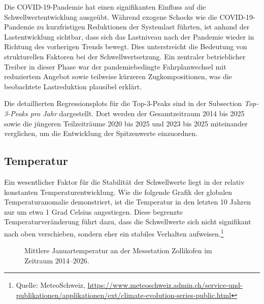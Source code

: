 \documentclass[12pt,oneside]{article}
\begin{document}
Die COVID-19-Pandemie hat einen signifikanten Einfluss auf die Schwellwertentwicklung ausgeübt. Während exogene Schocks wie die COVID-19-Pandemie zu kurzfristigen Reduktionen der Systemlast führten, ist anhand der Lastentwicklung sichtbar, dass sich das Lastniveau nach der Pandemie wieder in Richtung des vorherigen Trends bewegt. Dies unterstreicht die Bedeutung von strukturellen Faktoren bei der Schwellwertsetzung.
Ein zentraler betrieblicher Treiber in dieser Phase war der pandemiebedingte Fahrplanwechsel mit reduziertem Angebot sowie teilweise kürzeren Zugkompositionen, was die beobachtete Lastreduktion plausibel erklärt.

Die detaillierten Regressionsplots für die Top-3-Peaks sind in der Subsection \emph{Top-3-Peaks pro Jahr} dargestellt. Dort werden der Gesamtzeitraum 2014 bis 2025 sowie die jüngeren Teilzeiträume 2020 bis 2025 und 2023 bis 2025 miteinander verglichen, um die Entwicklung der Spitzenwerte einzuordnen.

\subsection{Temperatur}

Ein wesentlicher Faktor für die Stabilität der Schwellwerte liegt in der relativ konstanten Temperaturentwicklung. Wie die folgende Grafik der globalen Temperaturanomalie demonstriert, ist die Temperatur in den letzten 10 Jahren nur um etwa 1 Grad Celsius angestiegen. Diese begrenzte Temperaturveränderung führt dazu, dass die Schwellwerte sich nicht signifikant nach oben verschieben, sondern eher ein stabiles Verhalten aufweisen.\footnote{Quelle: MeteoSchweiz, \url{https://www.meteoschweiz.admin.ch/service-und-publikationen/applikationen/ext/climate-evolution-series-public.html}}

\begin{figure}[H]
  \centering
  \caption{Mittlere Januartemperatur an der Messstation Zollikofen im Zeitraum 2014--2026.}
  \label{fig:januar_temp_zollikofen_bar}
\end{figure}
\end{document}

